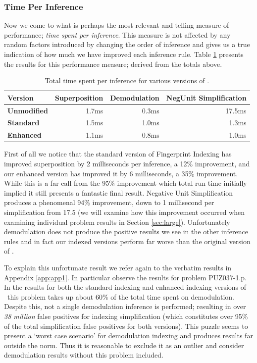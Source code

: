 \subsubsection{Time Per Inference}

Now we come to what is perhaps the most relevant and telling measure of performance;
\emph{time spent per inference}. This measure is not affected by any random factors
introduced by changing the order of inference and gives us a true indication of how
much we have improved each inference rule. Table \ref{tab:peri} presents the results
for this performance measure; derived from the totals above.

 \begin{table}[H]\begin{center}
  \caption{Total time spent per inference for various versions of \beagle.}
  \label{tab:peri}
\begin{tabular}{| l || r | r | r |}  \hline
Version&Superposition&Demodulation&NegUnit Simplification\\  \hline
\textbf{Unmodified}&1.7ms & 0.3ms & 17.5ms  \\
\textbf{Standard}  &1.5ms & 1.0ms & 1.3ms  \\
\textbf{Enhanced}  &1.1ms & 0.8ms & 1.0ms  \\\hline
\end{tabular}\end{center}\end{table}  

First of all we notice that the standard version of Fingerprint Indexing has
improved superposition by 2 milliseconds per inference, a 12\% improvement,
and our enhanced version has improved it by 6 milliseconds, a 35\% improvement.
While this is a far call from the 95\% improvement which total run time initially
implied it still presents a fantastic final result. Negative Unit Simplification
produces a phenomenal 94\% improvement, down to 1 millisecond per simplification from 17.5
(we will examine how this improvement occurred when examining individual problem
results in Section \ref{sec:large}).
Unfortunately demodulation does not produce the positive results we see in the other
inference rules and in fact our indexed versions perform far worse than the original
version of \beagle.

To explain this unfortunate result we refer again to the verbatim results in
Appendix \ref{app:app1}. In particular observe the results for problem PUZ037-1.p.
In the results for both the standard indexing and enhanced indexing versions of \beagle\ 
this problem takes up about 60\% of the total time spent on demodulation. Despite
this, not a single demodulation inference is performed; resulting in over \emph{38 million}
false positives for indexing simplification (which constitutes over 95\% of the
total simplification false positives for both versions). This puzzle seems to present
a `worst case scenario' for demodulation indexing and produces results far outside the norm.
Thus it is reasonable to exclude it as an outlier and consider demodulation results
without this problem included.

